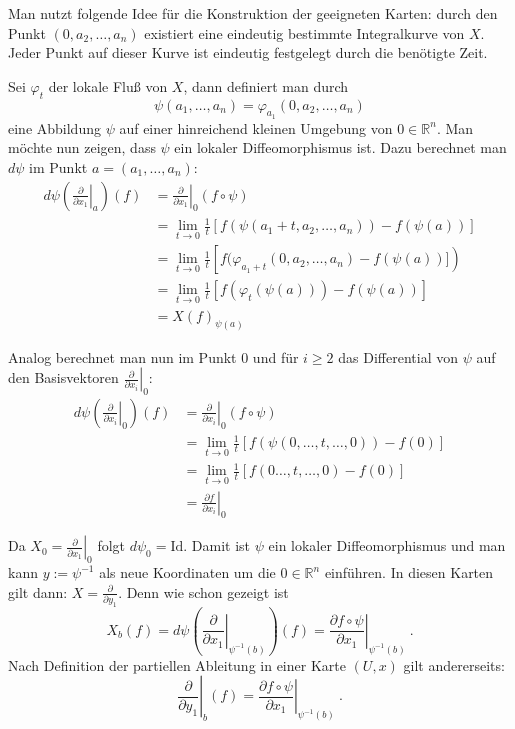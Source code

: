 \documentclass[12pt,a4paper]{article}
\def\R{\mathbb{R}}
\def\Id{\mathrm{Id}}
\begin{document}
\medskip

Man nutzt folgende Idee f\"ur die Konstruktion der geeigneten Karten: durch den
Punkt $(0,a_2,\ldots, a_n)$ existiert eine eindeutig bestimmte Integralkurve von
$X$. Jeder Punkt auf dieser Kurve ist eindeutig festgelegt durch die ben\"otigte
Zeit.

\medskip

Sei $\varphi_t$ der lokale Flu\ss{} von $X$, dann definiert man durch
$$
\psi(a_1,\ldots, a_n) = \varphi_{a_1}(0,a_2,\ldots, a_n)
$$
eine Abbildung $\psi$ auf einer hinreichend kleinen Umgebung von $0\in \R^n$. Man
m\"ochte nun zeigen, dass $\psi$ ein lokaler Diffeomorphismus ist.
Dazu berechnet man $d\psi$  im Punkt $a=(a_1,\ldots, a_n)$:
$$
\begin{array}{rl}
d\psi \left( \left. \frac{\partial}{\partial x_1}\right|_a \right)(f)
& = \left. \frac{\partial}{\partial x_1}\right|_0 (f\circ \psi) \\[1ex]
& = \lim_{t\rightarrow 0} \frac1t \left[ f(\psi(a_1+t,a_2,\ldots, a_n)) -f(\psi(a))\right]\\[1ex]
& = \lim_{t\rightarrow 0} \frac1t \left[ f(\varphi_{a_1+t}(0,a_2,\ldots, a_n) -f(\psi(a)) ] \right)\\[1ex]
& = \lim_{t\rightarrow 0} \frac1t \left[ f(\varphi_t(\psi(a))) - f(\psi(a))\right] \\[1ex]
& = X(f)_{\psi(a)}
\end{array}
$$

Analog berechnet man nun im Punkt $0$ und f\"ur $i\ge 2$  das Differential von $\psi$ auf den Basisvektoren
$\left. \frac{\partial}{\partial x_i}\right|_0$:
$$
\begin{array}{rl}
d\psi \left( \left. \frac{\partial}{\partial x_i}\right|_0 \right)(f)
& = \left. \frac{\partial}{\partial x_i}\right|_0 (f\circ \psi) \\[1ex]
& = \lim_{t\rightarrow 0} \frac1t \left[ f(\psi(0,\ldots,t, \ldots, 0)) -f(0)\right]\\[1ex]
& = \lim_{t\rightarrow 0} \frac1t \left[ f(0\ldots,t,\ldots, 0) -f(0)  \right]\\[1ex]
& = \left. \frac{\partial f}{\partial x_i}\right|_0
\end{array}
$$

Da $X_0 = \left. \frac{\partial}{\partial x_1}\right|_0$ folgt $d\psi_0= \Id$. Damit ist $\psi$
ein lokaler Diffeomorphismus und man kann $y:=\psi^{-1}$ als neue Koordinaten um die $0 \in \R^n$
einf\"uhren. In diesen Karten gilt dann: $X = \left. \frac{\partial}{\partial y_1}\right.$.
Denn wie schon gezeigt ist
$$
X_b(f) = d\psi \left( \left. \frac{\partial}{\partial x_1}\right|_{\psi^{-1}(b)}\right)(f) =
\left. \frac{\partial f \circ \psi }{\partial x_1}\right|_{\psi^{-1}(b)} \ .
$$
Nach Definition der partiellen Ableitung in einer Karte $(U,x)$ gilt andererseits:
$$
 \left. \frac{\partial}{\partial y_1}\right|_b(f) =
 \left. \frac{\partial f \circ \psi }{\partial x_1}\right|_{\psi^{-1}(b)} \ .
$$
\end{document}
